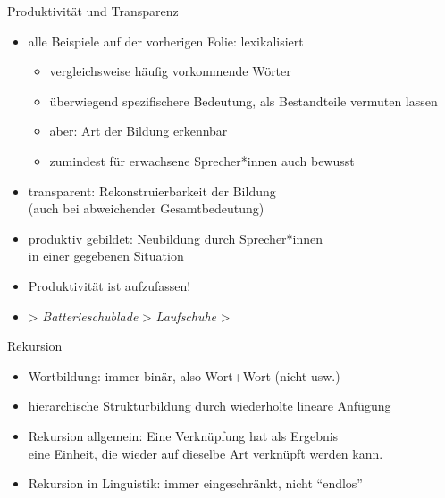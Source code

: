 \begin{frame}
  {Produktivität und Transparenz}
  \onslide<+->
  \begin{itemize}[<+->]
    \item \alert{alle} Beispiele auf der vorherigen Folie: \alert{lexikalisiert}
      \begin{itemize}[<+->]
        \item vergleichsweise häufig vorkommende Wörter
        \item überwiegend spezifischere Bedeutung, als Bestandteile vermuten lassen
        \item aber: Art der Bildung erkennbar
        \item zumindest für erwachsene Sprecher*innen auch bewusst
      \end{itemize}
      \Halbzeile
    \item \alert{transparent}: Rekonstruierbarkeit der Bildung\\
      (auch bei abweichender Gesamtbedeutung)
      \Halbzeile
    \item \alert{produktiv gebildet}: Neubildung durch Sprecher*innen\\
      in einer gegebenen Situation
    \item Produktivität ist  aufzufassen!
    \item {} > \textit{Batterieschublade} > \textit{Laufschuhe} > 
  \end{itemize}
\end{frame}

\begin{frame}[fragile,label=hierarchie]
  {Rekursion}
  \onslide<+->
  \onslide<+->
  \begin{center}
    \scalebox{0.7}{
      \begin{forest}
        [Bushaltestellenunterstandsreparatur
          [Bushaltestellenunterstand
            [Bushaltestelle
              [Bus]
              [Haltestelle
                [halten]
                [Stelle]
              ]
            ]
            [Unterstand
              [unter]
              [Stand]
            ]
          ]
          [Reparatur]
        ]
      \end{forest}
    }
  \end{center}
  \begin{itemize}[<+->]
    \item Wortbildung: immer \alert{binär}, also \alert{Wort+Wort} (nicht  usw.)
      \Viertelzeile
    \item \alert{hierarchische Strukturbildung} durch wiederholte lineare Anfügung
      \Viertelzeile
    \item Rekursion allgemein: \alert{Eine Verknüpfung hat als Ergebnis\\
      eine Einheit, die wieder auf dieselbe Art verknüpft werden kann.}
    \item Rekursion in Linguistik: immer eingeschränkt, nicht "`endlos"'
  \end{itemize}
\end{frame}

